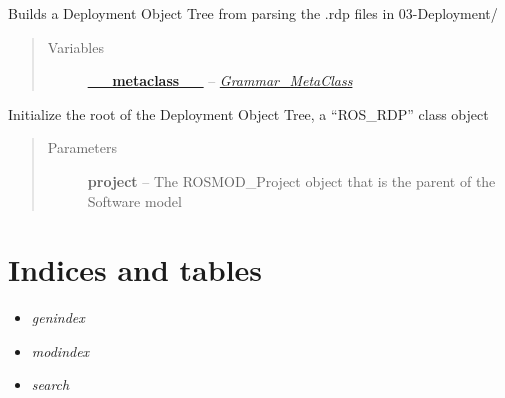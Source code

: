 \documentclass[letterpaper,10pt,english]{sphinxmanual}
\begin{document}
\begin{fulllineitems}
\label{class_Deployment_Builder:ROSMOD_Deployment_Builder}
Builds a Deployment Object Tree from parsing the .rdp files in 03-Deployment/
\begin{quote}\begin{description}
\item[{Variables}] \leavevmode
\href{http://docs.python.org/reference/datamodel.html\#\_\_metaclass\_\_}{\textbf{\_\_metaclass\_\_}} -- {\hyperref[class_Grammar_MetaClass:id1]{\emph{Grammar\_MetaClass}}}

\end{description}\end{quote}

\begin{fulllineitems}
\label{class_Deployment_Builder:ROSMOD_Deployment_Builder.__init__}
Initialize the root of the Deployment Object Tree, a ``ROS\_RDP'' class object
\begin{quote}\begin{description}
\item[{Parameters}] \leavevmode
\textbf{project} -- The ROSMOD\_Project object that is the parent of the Software model

\end{description}\end{quote}

\end{fulllineitems}


\end{fulllineitems}



\chapter{Indices and tables}
\label{index:indices-and-tables}\begin{itemize}
\item {} 
\emph{genindex}

\item {} 
\emph{modindex}

\item {} 
\emph{search}

\end{itemize}



\renewcommand{\indexname}{Index}
\printindex
\end{document}
